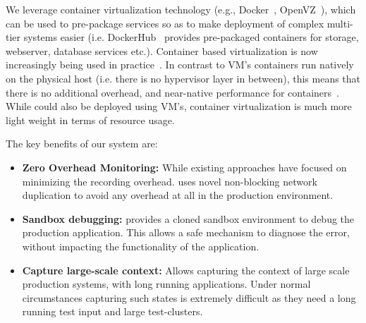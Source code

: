 We leverage container virtualization technology (e.g., Docker~\cite{docker}, OpenVZ~\cite{openvz}), which can be used to pre-package services so as to make deployment of complex multi-tier systems easier (i.e. DockerHub~\cite{dockerhub,dockerhub_article} provides pre-packaged containers for storage, webserver, database services etc.).
Container based virtualization is now increasingly being used in practice~\cite{containerCloud}.
In contrast to VM's containers run natively on the physical host (i.e. there is no hypervisor layer in between), this means that there is no additional overhead, and near-native performance for containers~\cite{performanceComparisonlxcVM,performanceEvalContainers}.
While \parikshan could also be deployed using VM's, container virtualization is much more light weight in terms of resource usage.



\noindent
The key benefits of our system are:
\begin{itemize}[leftmargin=*,topsep=0pt,itemsep=-1ex,partopsep=1ex,parsep=1ex]
\item \textbf{Zero Overhead Monitoring:} While existing approaches have focused on minimizing the recording overhead. 
\parikshan uses novel non-blocking network duplication to avoid any overhead at all in the production environment.	
\item \textbf{Sandbox debugging:} \parikshan provides a cloned sandbox environment to debug the production application.
This allows a safe mechanism to diagnose the error, without impacting the functionality of the application.
\item \textbf{Capture large-scale context:} Allows capturing the context of large scale production systems, with long running applications. Under normal circumstances capturing such states is extremely difficult as they need a long running test input and large test-clusters.
\end{itemize}

